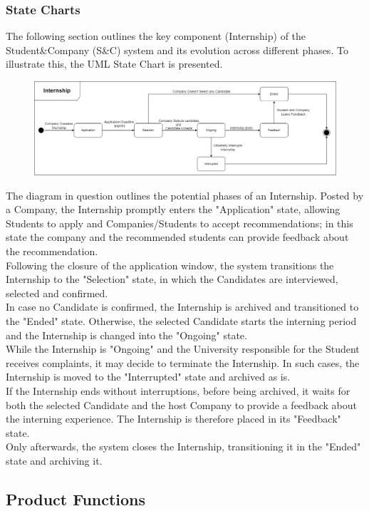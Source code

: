 \documentclass[a4paper,12pt]{article}
\begin{document}
\subsubsection{State Charts}
The following section outlines the key component (Internship) of the Student\&Company (S\&C) system and its evolution across different phases. To illustrate this, the UML State Chart is presented.
\begin{figure}[H]
    \centering
    \includegraphics[scale = 0.30]{figures/StateCharts.drawio.png}
    \centering
\end{figure}
The diagram in question outlines the potential phases of an Internship. Posted by a Company, the Internship promptly enters the "Application" state, allowing Students to apply and Companies/Students to accept recommendations; in this state the company and the recommended students can provide feedback about the recommendation.
\\Following the closure of the application window, the system transitions the Internship to the "Selection" state, in which the Candidates are interviewed, selected and confirmed. 
\\In case no Candidate is confirmed, the Internship is archived and transitioned to the "Ended" state. Otherwise, the selected Candidate starts the interning period and the Internship is changed into the "Ongoing" state. 
\\While the Internship is "Ongoing" and the University responsible for the Student receives complaints, it may decide to terminate the Internship. In such cases, the Internship is moved to the "Interrupted" state and archived as is.
\\If the Internship ends without interruptions, before being archived, it waits for both the selected Candidate and the host Company to provide a feedback about the interning experience. The Internship is therefore placed in its "Feedback" state.
\\Only afterwards, the system closes the Internship, transitioning it in the "Ended" state and archiving it.


\subsection{Product Functions}
\end{document}
